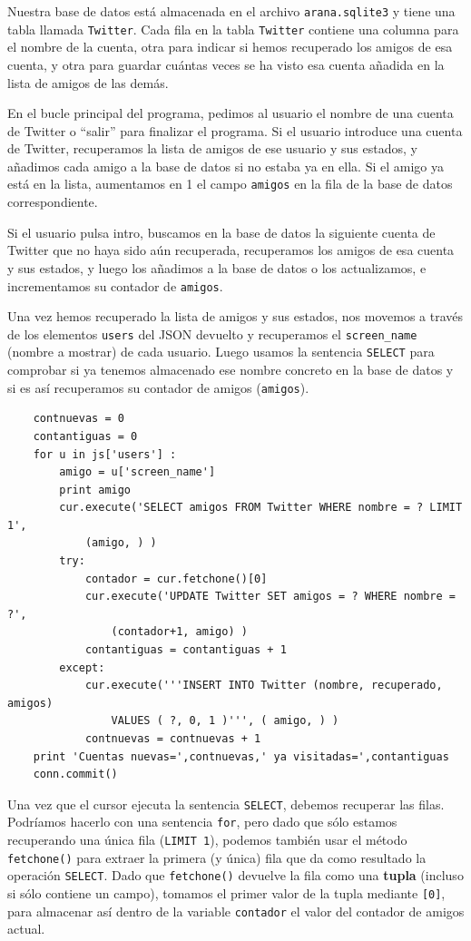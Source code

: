 \afterverb
%
Nuestra base de datos está almacenada en el archivo {\tt arana.sqlite3} y tiene
una tabla llamada {\tt Twitter}. Cada fila en la tabla {\tt Twitter}
contiene una columna para el nombre de la cuenta, otra para indicar si hemos recuperado los
amigos de esa cuenta, y otra para guardar cuántas veces se ha visto esa cuenta añadida en
la lista de amigos de las demás.

En el bucle principal del programa, pedimos al usuario el nombre de una cuenta
de Twitter o ``salir'' para finalizar el programa.
Si el usuario introduce una cuenta de Twitter, recuperamos la
lista de amigos de ese usuario y sus estados,
y añadimos cada amigo a la base de datos si no
estaba ya en ella. Si el amigo ya está en la lista,
aumentamos en 1 el campo {\tt amigos} en la fila de la base de datos correspondiente.

Si el usuario pulsa intro, buscamos en la base de datos la siguiente
cuenta de Twitter que no haya sido aún recuperada, recuperamos los
amigos de esa cuenta y sus estados, y luego los añadimos a la base de datos
o los actualizamos, e incrementamos su contador de {\tt amigos}.

Una vez hemos recuperado la lista de amigos y sus estados, nos movemos
a través de los elementos {\tt users} del JSON devuelto
y recuperamos el \verb"screen_name" (nombre a mostrar) de cada usuario. Luego usamos
la sentencia {\tt SELECT} para comprobar si ya tenemos almacenado ese
nombre concreto en la base de datos y si es así recuperamos su
contador de amigos ({\tt amigos}).

\beforeverb
\begin{verbatim}
    contnuevas = 0
    contantiguas = 0
    for u in js['users'] :
	    amigo = u['screen_name']
	    print amigo
	    cur.execute('SELECT amigos FROM Twitter WHERE nombre = ? LIMIT 1', 
		    (amigo, ) )
	    try:
		    contador = cur.fetchone()[0]
		    cur.execute('UPDATE Twitter SET amigos = ? WHERE nombre = ?', 
			    (contador+1, amigo) )
		    contantiguas = contantiguas + 1
		except:
		    cur.execute('''INSERT INTO Twitter (nombre, recuperado, amigos) 
			    VALUES ( ?, 0, 1 )''', ( amigo, ) )
		    contnuevas = contnuevas + 1
    print 'Cuentas nuevas=',contnuevas,' ya visitadas=',contantiguas
    conn.commit()
\end{verbatim}
\afterverb
%
Una vez que el cursor ejecuta la sentencia {\tt SELECT},
debemos recuperar las filas. Podríamos hacerlo con una sentencia {\tt for},
pero dado que sólo estamos recuperando una única fila
({\tt LIMIT 1}), podemos también usar el método {\tt fetchone()} para extraer
la primera (y única) fila que da como resultado la operación {\tt SELECT}.
Dado que {\tt fetchone()} devuelve la fila como una {\bf tupla} (incluso si sólo
contiene un campo), tomamos el primer valor de la tupla mediante {\tt [0]}, para
almacenar así dentro de la variable {\tt contador} el valor del contador de amigos actual.


